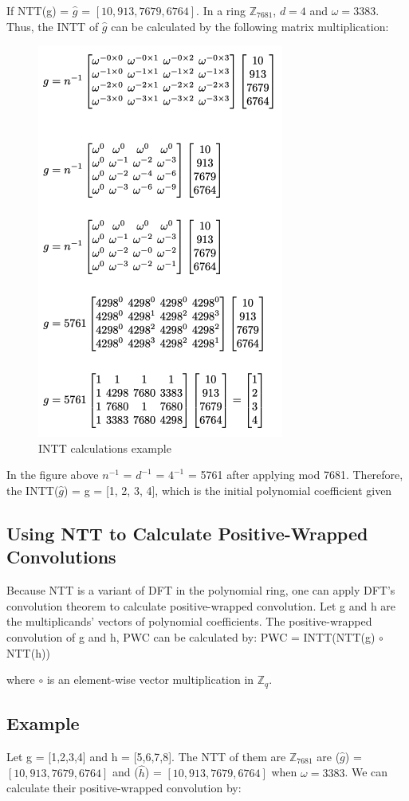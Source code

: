 \documentclass{techrep}
\theoremstyle{definition}
\theoremstyle{plain}
\newcommand{\Z}{\mathbb{Z}}
\begin{document}
If NTT(g) = $\hat{g}$ = $[10, 913, 7679, 6764]$. In a ring $\Z_{7681}$, $d = 4$ and $\omega =3383$. Thus, the INTT of $\hat{g}$ can be calculated by the following matrix multiplication:


\begin{figure}[H]
 	\centering
 	\includegraphics[width=.4\columnwidth]{fig/INTT_cal.png}
 	\caption{INTT calculations example} 
\label{fig:NTT_cal}
\end{figure}

In the figure above $n^{-1}$ = $d^{-1}$ = $4^{-1}$ = 5761 after applying mod 7681. Therefore, the INTT($\hat{g}$) = g = [1, 2, 3, 4], which is the initial polynomial coefficient given  

\subsection{Using NTT to Calculate Positive-Wrapped Convolutions}

Because NTT is a variant of DFT in the polynomial ring, one can apply DFT’s convolution theorem to calculate positive-wrapped convolution. Let g and h are the multiplicands’ vectors of polynomial coefficients. The positive-wrapped convolution of g and h, PWC can be calculated by:
PWC = INTT(NTT(g) $\circ$ NTT(h))

where $\circ$ is an element-wise vector multiplication in $\Z_{q}$.

\subsection{Example}
Let g = [1,2,3,4] and h = [5,6,7,8]. The NTT of them are $\Z_{7681}$ are ($\hat{g}$) = $[10, 913, 7679, 6764]$ and ($\hat{h}$) = $[10, 913, 7679, 6764]$ when $\omega =3383$. We can calculate their positive-wrapped convolution by:
\end{document}
